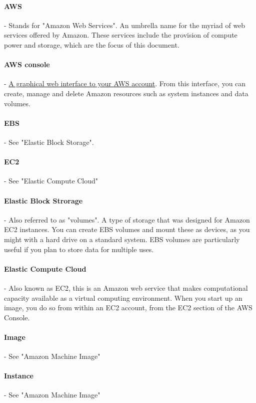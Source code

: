 \paragraph{AWS} - Stands for "Amazon Web Services". An umbrella name for the myriad of web services offered by Amazon. These services include the provision of compute power and storage, which are the focus of this document.

\paragraph{AWS console} - \href{http://aws.amazon.com/console/}{A graphical web interface to your AWS account}. From this interface, you can create, manage and delete Amazon resources such as system instances and data volumes.

\paragraph{EBS} - See "Elastic Block Storage".

\paragraph{EC2} - See "Elastic Compute Cloud"  

\paragraph{Elastic Block Strorage} - Also referred to as "volumes". A type of storage that was designed for Amazon EC2 instances. You can create EBS volumes and mount these as devices, as you might with a hard drive on a standard system. EBS volumes are particularly useful if you plan to store data for multiple uses.

\paragraph{Elastic Compute Cloud} - Also known as EC2, this is an Amazon web service that makes computational capacity available as a virtual computing environment. When you start up an image, you do so from within an EC2 account, from the EC2 section of the AWS Console. 

\paragraph{Image} - See "Amazon Machine Image"

\paragraph{Instance} - See "Amazon Machine Image"

